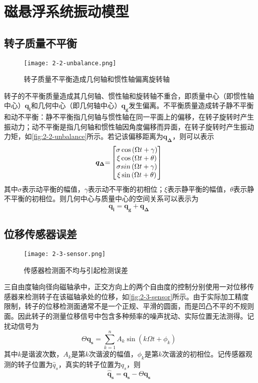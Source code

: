 \documentclass[
  lang=cn,
  degree=master,
  openany,oneside
]{nuaathesis}
\begin{document}
\section{磁悬浮系统振动模型}
\subsection{转子质量不平衡}
\begin{figure}[h!]
	\texttt{[image: 2-2-unbalance.png]}
	\caption{转子质量不平衡造成几何轴和惯性轴偏离旋转轴}
	\label{fig:2-2-unbalance}
\end{figure}

转子的不平衡质量造成其几何轴、惯性轴和旋转轴不重合，即质量中心（即惯性轴中心）$ \boldsymbol{q_i} $和几何中心（即几何轴中心）$ \boldsymbol{q_g} $发生偏离。不平衡质量造成转子静不平衡和动不平衡：静不平衡指几何轴与惯性轴在同一平面上的偏移，在转子旋转时产生振动力；动不平衡是指几何轴和惯性轴因角度偏移而异面，在转子旋转时产生振动力矩，如\autoref{fig:2-2-unbalance}所示。若记该偏移距离为$ \boldsymbol{q_{\Delta}} $，则可以表示
\begin{equation}
\label{eq:q_delta}
\boldsymbol{{q}_\Delta }{ = }\left[ 
{\begin{matrix}
   {\sigma \cos \left( {\Omega t + \gamma } \right)}  \cr 
   {\xi \cos \left( {\Omega t + \theta } \right)}  \cr 
   {\sigma sin\left( {\Omega t + \gamma } \right)}  \cr 
   {\xi \sin \left( {\Omega t + \theta } \right)}  \cr 
\end{matrix}} 
 \right]
\end{equation}
其中$\sigma$表示动平衡的幅值，$\gamma$表示动不平衡的初相位；$\xi$表示静平衡的幅值，$\theta$表示静不平衡的初相位。则几何中心与质量中心的空间关系可以表示为
\begin{equation}
\boldsymbol{{q}_i}{ = }\boldsymbol{{q}_{g}} + \boldsymbol{{q}_\Delta }
\end{equation}

\subsection{位移传感器误差}

\begin{figure}[h!]
	\texttt{[image: 2-3-sensor.png]}
	\caption{传感器检测面不均与引起检测误差}
	\label{fig:2-3-sensor}
\end{figure}

三自由度轴向径向磁轴承中，正交方向上的两个自由度的控制分别使用一对位移传感器来检测转子在该磁轴承处的位移，如\autoref{fig:2-3-sensor}所示。由于实际加工精度限制，转子的位移检测面通常不是一个正规、平滑的圆面，而是凹凸不平的不规则面。因此转子的测量位移信号中包含多种频率的噪声扰动、实际位置无法测得。记扰动信号为
\begin{equation}
\Theta \boldsymbol{{q}_s} = \sum\limits_{k = 1}^n {{A_k}\sin \left( {k\Omega t + {\phi _k}} \right)} 
\end{equation}
其中$k$是谐波次数，$A_k$是第$k$次谐波的幅值，$\phi _k$是第$k$次谐波的初相位。记传感器观测的转子位置为${\hat q}_s$，真实的转子位置为$q_s$，则
\begin{equation}
\boldsymbol{{\hat q}_s} = \boldsymbol{{q}_s} - \Theta \boldsymbol{{q}_s}
\end{equation}
\end{document}
